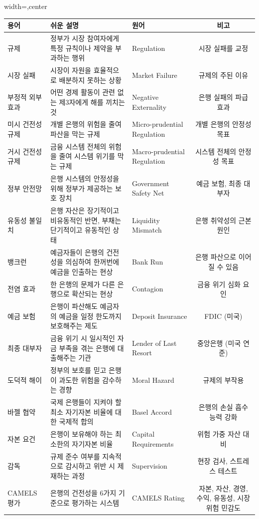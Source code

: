 \documentclass[11pt,a4paper]{article}
\theoremstyle{definition}
\begin{document}
\begin{adjustbox}{width=\textwidth,center}
\begin{tabular}{lllc}
\toprule
\textbf{용어} & \textbf{쉬운 설명} & \textbf{원어} & \textbf{비고} \\
\midrule
규제 & 정부가 시장 참여자에게 특정 규칙이나 제약을 부과하는 행위 & Regulation & 시장 실패를 교정 \\
시장 실패 & 시장이 자원을 효율적으로 배분하지 못하는 상황 & Market Failure & 규제의 주된 이유 \\
부정적 외부 효과 & 어떤 경제 활동이 관련 없는 제3자에게 해를 끼치는 것 & Negative Externality & 은행 실패의 파급 효과 \\
미시 건전성 규제 & 개별 은행의 위험을 줄여 파산을 막는 규제 & Micro-prudential Regulation & 개별 은행의 안정성 목표 \\
거시 건전성 규제 & 금융 시스템 전체의 위험을 줄여 시스템 위기를 막는 규제 & Macro-prudential Regulation & 시스템 전체의 안정성 목표 \\
정부 안전망 & 은행 시스템의 안정성을 위해 정부가 제공하는 보호 장치 & Government Safety Net & 예금 보험, 최종 대부자 \\
유동성 불일치 & 은행 자산은 장기적이고 비유동적인 반면, 부채는 단기적이고 유동적인 상태 & Liquidity Mismatch & 은행 취약성의 근본 원인 \\
뱅크런 & 예금자들이 은행의 건전성을 의심하여 한꺼번에 예금을 인출하는 현상 & Bank Run & 은행 파산으로 이어질 수 있음 \\
전염 효과 & 한 은행의 문제가 다른 은행으로 확산되는 현상 & Contagion & 금융 위기 심화 요인 \\
예금 보험 & 은행이 파산해도 예금자의 예금을 일정 한도까지 보호해주는 제도 & Deposit Insurance & FDIC (미국) \\
최종 대부자 & 금융 위기 시 일시적인 자금 부족을 겪는 은행에 대출해주는 기관 & Lender of Last Resort & 중앙은행 (미국 연준) \\
도덕적 해이 & 정부의 보호를 믿고 은행이 과도한 위험을 감수하는 경향 & Moral Hazard & 규제의 부작용 \\
바젤 협약 & 국제 은행들이 지켜야 할 최소 자기자본 비율에 대한 국제적 합의 & Basel Accord & 은행의 손실 흡수 능력 강화 \\
자본 요건 & 은행이 보유해야 하는 최소한의 자기자본 비율 & Capital Requirements & 위험 가중 자산 대비 \\
감독 & 규제 준수 여부를 지속적으로 감시하고 위반 시 제재하는 과정 & Supervision & 현장 검사, 스트레스 테스트 \\
CAMELS 평가 & 은행의 건전성을 6가지 기준으로 평가하는 시스템 & CAMELS Rating & 자본, 자산, 경영, 수익, 유동성, 시장 위험 민감도 \\

\end{tabular}
\end{adjustbox}
\end{document}
